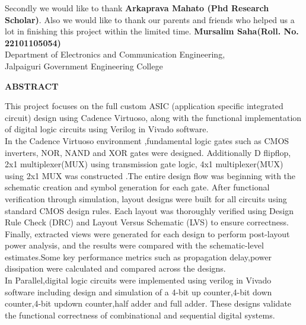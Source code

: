 \documentclass[12pt]{article}
\begin{document}
Secondly we would like to thank \textbf{Arkaprava Mahato (Phd Research Scholar)}.
Also we would like to thank our parents and friends who helped us a lot in finishing this project within the limited time.
\vskip 1in
\vskip 1in
\noindent \textbf{Mursalim Saha(Roll. No. 22101105054)}\\
Department of Electronics and Communication Engineering,\\
Jalpaiguri Government Engineering College\\
\newpage
\begin{center}
\begin{large}
{\bf ABSTRACT}
\end{large}
\end{center}
\vskip 0.2in
This project focuses on the full custom ASIC (application specific integrated circuit) design using Cadence Virtuoso, along with the functional implementation of digital logic circuits using Verilog in Vivado software.\\
In the Cadence Virtuoso environment ,fundamental logic gates such as CMOS inverters, NOR, NAND and XOR gates were designed. Additionally D flipflop, 2x1 multiplexer(MUX) using transmission gate logic, 4x1 multiplexer(MUX) using 2x1 MUX was constructed .The entire design flow was beginning with the schematic creation and symbol generation for each gate. After functional verification through simulation, layout designs were built for all circuits using standard CMOS design rules. Each layout was thoroughly verified using Design Rule Check (DRC) and Layout Versus Schematic (LVS) to ensure correctness. Finally, extracted views were generated for each design to perform post-layout power analysis, and the results were compared with the schematic-level estimates.Some key performance metrics such as propagation delay,power dissipation were calculated and compared across the designs.\\
In Parallel,digital logic circuits were implemented using verilog in Vivado software including design and simulation of a 4-bit up counter,4-bit down counter,4-bit updown counter,half adder and full adder. These designs validate the functional correctness of combinational and sequential digital systems.
\newpage
\tableofcontents
\listoffigures
\listoftables
\newpage
\end{document}
